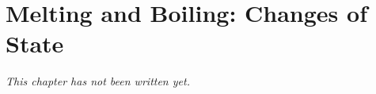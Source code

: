 \chapter{Melting and Boiling: Changes of State}\label{ch:g4:changes-of-state}


\emph{This chapter has not been written yet.}
